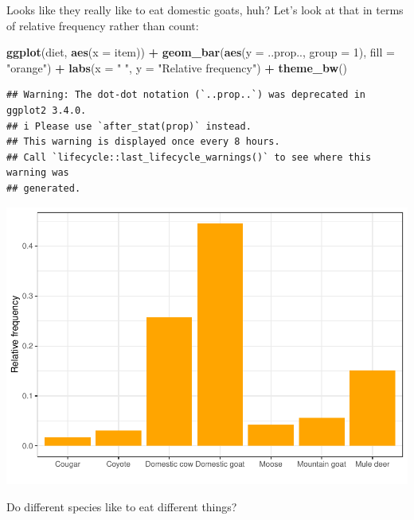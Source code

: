 \documentclass[
]{book}
\newenvironment{Shaded}{\begin{snugshade}}{\end{snugshade}}
\newcommand{\AttributeTok}[1]{\textcolor[rgb]{0.13,0.29,0.53}{#1}}
\newcommand{\DecValTok}[1]{\textcolor[rgb]{0.00,0.00,0.81}{#1}}
\newcommand{\FunctionTok}[1]{\textcolor[rgb]{0.13,0.29,0.53}{\textbf{#1}}}
\newcommand{\NormalTok}[1]{#1}
\newcommand{\SpecialCharTok}[1]{\textcolor[rgb]{0.81,0.36,0.00}{\textbf{#1}}}
\newcommand{\StringTok}[1]{\textcolor[rgb]{0.31,0.60,0.02}{#1}}
\begin{document}
Looks like they really like to eat domestic goats, huh? Let's look at that in
terms of relative frequency rather than count:

\begin{Shaded}
\begin{Highlighting}[]
\FunctionTok{ggplot}\NormalTok{(diet, }\FunctionTok{aes}\NormalTok{(}\AttributeTok{x =}\NormalTok{ item)) }\SpecialCharTok{+}
  \FunctionTok{geom\_bar}\NormalTok{(}\FunctionTok{aes}\NormalTok{(}\AttributeTok{y =}\NormalTok{ ..prop.., }\AttributeTok{group =} \DecValTok{1}\NormalTok{), }\AttributeTok{fill =} \StringTok{"orange"}\NormalTok{) }\SpecialCharTok{+} 
  \FunctionTok{labs}\NormalTok{(}\AttributeTok{x =} \StringTok{" "}\NormalTok{, }\AttributeTok{y =} \StringTok{"Relative frequency"}\NormalTok{) }\SpecialCharTok{+}
  \FunctionTok{theme\_bw}\NormalTok{()}
\end{Highlighting}
\end{Shaded}

\begin{verbatim}
## Warning: The dot-dot notation (`..prop..`) was deprecated in ggplot2 3.4.0.
## i Please use `after_stat(prop)` instead.
## This warning is displayed once every 8 hours.
## Call `lifecycle::last_lifecycle_warnings()` to see where this warning was
## generated.
\end{verbatim}

\includegraphics{reproducible-science_files/figure-latex/gg25-1.pdf}

Do different species like to eat different things?
\end{document}
